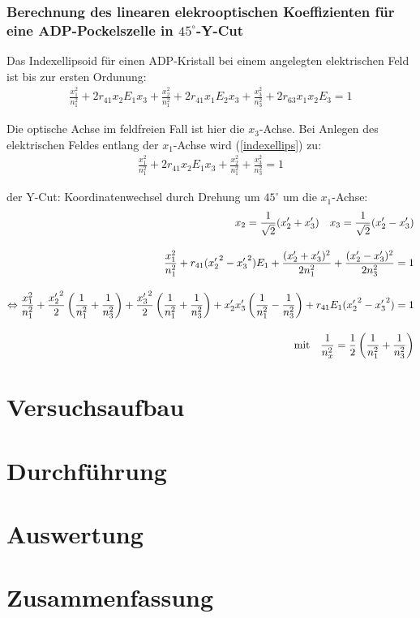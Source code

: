 \documentclass[12pt]{article}
\begin{document}
\subsubsection[Berechnung des linearen elektrooptischen Koeffizienten]{Berechnung des linearen elekrooptischen Koeffizienten für eine ADP-Pockelszelle in $45^\circ$-Y-Cut}
Das Indexellipsoid für einen ADP-Kristall bei einem angelegten elektrischen Feld ist bis zur ersten Ordunung:
\begin{align}
\label{indexellips}
 \frac{x_1^2}{n_1^2} + 2 r_{41} x_2 E_1 x_3 + \frac{x_2^2}{n_1^2} + 2 r_{41} x_1 E_2 x_3 + \frac{x_3^2}{n_3^2} + 2 r_{63} x_1 x_2 E_3 = 1
\end{align}

Die optische Achse im feldfreien Fall ist hier die $x_3$-Achse. Bei Anlegen des elektrischen Feldes entlang der $x_1$-Achse wird (\ref{indexellips}) zu:
\begin{align}
 \frac{x_1^2}{n_1^2} + 2 r_{41} x_2 E_1 x_3 + \frac{x_2^2}{n_1^2} + \frac{x_3^2}{n_3^2} = 1
\end{align}

der Y-Cut: Koordinatenwechsel durch Drehung um $45^\circ$ um die $x_1$-Achse:
\begin{align}
 \notag x_2 = \frac{1}{\sqrt{2}} (x'_2 + x'_3) \quad x_3 = \frac{1}{\sqrt{2}} (x'_2 - x'_3) \\[10pt] 
 \frac{x_1^2}{n_1^2} + r_{41} ( {x'_2}^2 - {x'_3}^2) E_1 + \frac{(x'_2 + x'_3)^2}{2 n_1^2} + \frac{(x'_2 - x'_3)^2}{2 n_3^2} = 1\\[10pt]
 \Leftrightarrow \frac{x_1^2}{n_1^2} + \frac{{x'_2}^2}{2} \left(\frac{1}{n_1^2} + \frac{1}{n_3^2}\right) + \frac{{x'_3}^2}{2} \left(\frac{1}{n_1^2} + \frac{1}{n_3^2}\right) + x'_2 x'_3 \left(\frac{1}{n_1^2} - \frac{1}{n_3^2}\right) + r_{41} E_1 ({x'_2}^2 - {x'_3}^2) = 1 \\[10pt]
 \textnormal{mit} \quad \frac{1}{n_x^2} = \frac{1}{2}\left(\frac{1}{n_1^2} + \frac{1}{n_3^2}\right)
\end{align}

\section{Versuchsaufbau}

\section{Durchführung}

\section{Auswertung}

\section{Zusammenfassung}
\end{document}
